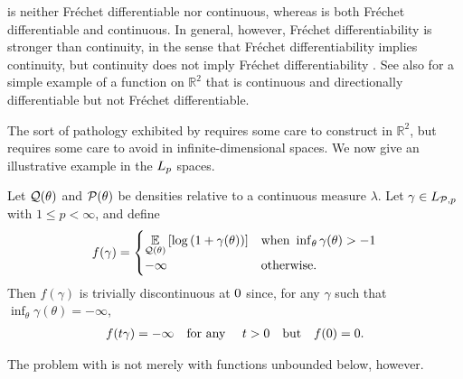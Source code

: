  is neither Fr{\'e}chet differentiable nor continuous,
whereas  is both Fr{\'e}chet differentiable and
continuous.  In general, however, Fr{\'e}chet differentiability is stronger than
continuity, in the sense that Fr{\'e}chet differentiability implies continuity,
but continuity does not imply Fr{\'e}chet differentiability \citep[Proposition
4.8 (d)]{zeidler:2013:functional}.  See also \citet[Example
1.9]{averbukh:1967:theory} for a simple example of a function on $\mathbb{R}^2$
that is continuous and directionally differentiable but not Fr{\'e}chet
differentiable.

The sort of pathology exhibited by 
requires some care to construct in $\mathbb{R}^2$, but requires some care to
avoid in infinite-dimensional spaces.  We now give an illustrative example in
the ${L_{p}}$ spaces.


\begin{ex}
%
Let $\mathcal{Q}(\theta)$ and $\mathcal{P}(\theta)$ be densities relative to a continuous measure
$\lambda$.  Let $\gamma \in {L_{\mathcal{P},p}}$ with $1 \le p < \infty$, and define
%
\begin{align*}
%
f(\gamma) = \begin{cases}
\expect{\q(\theta)}{\log\left(1 + \gamma(\theta)\right)}
    & \textrm{when }\inf_\theta \gamma(\theta) > -1 \\
-\infty & \textrm{otherwise}.
\end{cases}
%
\end{align*}
%
Then $f(\gamma)$ is trivially discontinuous at $0$ since, for any $\gamma$
such that $\inf_\theta \gamma(\theta) = -\infty$,
%
\begin{align*}
%
f(\t \gamma) = -\infty \mathtxt{for any }\t > 0 \mathtxt{but} f(\phiz) = 0.
%
\end{align*}
%
\end{ex}

The problem with  is not merely with
functions unbounded below, however.

